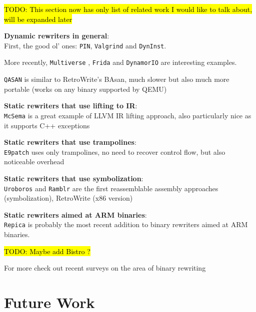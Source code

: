 \documentclass[a4paper,11pt,oneside]{report}
\newcommand{\sysname}{RetroWrite\xspace}
\newcommand{\todo}[1]{%
	\begingroup 
	\sethlcolor{cyan}%
	\hl{TODO: #1}%
	\endgroup
}
\begin{document}
{

\setlength{\parindent}{0cm}

\todo{This section now has only list of related work I would like to talk 
about, will be expanded later}



\textbf{Dynamic rewriters in general}:\\
First, the good ol' ones: \texttt{PIN}\cite{pin}, 
\texttt{Valgrind}\cite{valgrind} and \texttt{DynInst}\cite{dyninst}.

More recently, \texttt{Multiverse} \cite{multiverse}, \texttt{Frida} and 
\texttt{DynamorIO} are interesting examples.

\texttt{QASAN}\cite{qasan} is similar to \sysname's BAsan, much slower but 
also much more portable (works on any binary supported by QEMU)



\textbf{Static rewriters that use lifting to IR}:\\
\texttt{McSema} \cite{mcsema} is a great example of LLVM IR lifting approach, 
also particularly nice as it supports C++ exceptions

\textbf{Static rewriters that use trampolines}:\\
\texttt{E9patch}\cite{e9patch} uses only trampolines, no need to recover 
control flow, but also noticeable overhead


\textbf{Static rewriters that use symbolization}:\\
\texttt{Uroboros}\cite{uroboros} and \texttt{Ramblr}\cite{ramblr} are the first 
reassemblable assembly approaches (symbolization), \sysname 
\cite{dinesh20oakland} (x86 version)

\textbf{Static rewriters aimed at ARM binaries}:\\
\texttt{Repica} \cite{repica} is probably the most recent addition to binary 
rewriters aimed at ARM binaries.  

\todo{Maybe add Bistro ? } \cite{bistro}

For more check out recent surveys on the area of binary rewriting 
\cite{binaryrewritingsurvey}

}

\chapter{Future Work}
\end{document}
